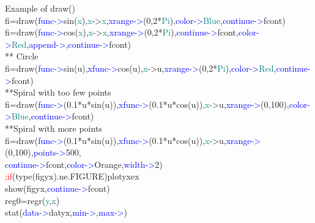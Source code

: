 \begin{example}[drawex]Example of \textcolor{VioletRed}{draw}()\\ 
\label{drawex} 
\noindent fi=\textcolor{VioletRed}{draw}(\textcolor{blue}{func->}\textcolor{VioletRed}{sin}(\textcolor{teal}{x}),\textcolor{teal}{x}->\textcolor{teal}{x},\textcolor{blue}{xrange->}(0,2*\textcolor{teal}{Pi}),\textcolor{blue}{color->}\textcolor{teal}{Blue},\textcolor{blue}{continue->}fcont)\\ 
fi=\textcolor{VioletRed}{draw}(\textcolor{blue}{func->}\textcolor{VioletRed}{cos}(\textcolor{teal}{x}),\textcolor{teal}{x}->\textcolor{teal}{x},\textcolor{blue}{xrange->}(0,2*\textcolor{teal}{Pi}),\textcolor{blue}{continue->}fcont,\textcolor{blue}{color->}\textcolor{teal}{Red},\textcolor{blue}{append->},\textcolor{blue}{continue->}fcont)\\ 
{\color{ForestGreen}** Circle}\\ 
fi=\textcolor{VioletRed}{draw}(\textcolor{blue}{func->}\textcolor{VioletRed}{sin}(u),\textcolor{blue}{xfunc->}\textcolor{VioletRed}{cos}(u),\textcolor{teal}{x}->u,\textcolor{blue}{xrange->}(0,2*\textcolor{teal}{Pi}),\textcolor{blue}{color->}\textcolor{teal}{Red},\textcolor{blue}{continue->}fcont)\\ 
{\color{ForestGreen}**Spiral with too few points}\\ 
fi=\textcolor{VioletRed}{draw}(\textcolor{blue}{func->}(0.1*u*\textcolor{VioletRed}{sin}(u)),\textcolor{blue}{xfunc->}(0.1*u*\textcolor{VioletRed}{cos}(u)),\textcolor{teal}{x}->u,\textcolor{blue}{xrange->}(0,100),\textcolor{blue}{color->}\textcolor{teal}{Blue},\textcolor{blue}{continue->}fcont)\\ 
{\color{ForestGreen}**Spiral with more points}\\ 
fi=\textcolor{VioletRed}{draw}(\textcolor{blue}{func->}(0.1*u*\textcolor{VioletRed}{sin}(u)),\textcolor{blue}{xfunc->}(0.1*u*\textcolor{VioletRed}{cos}(u)),\textcolor{teal}{x}->u,\textcolor{blue}{xrange->}(0,100),\textcolor{blue}{points->}500,\\ 
\textcolor{blue}{continue->}fcont,\textcolor{blue}{color->}Orange,\textcolor{blue}{width->}2)\\ 
\textcolor{Red}{;if}(\textcolor{VioletRed}{type}(figyx).ne.FIGURE)plotyxex\\ 
\textcolor{VioletRed}{show}(figyx,\textcolor{blue}{continue->}fcont)\\ 
reg0=\textcolor{VioletRed}{regr}(\textcolor{teal}{y},\textcolor{teal}{x})\\ 
\textcolor{VioletRed}{stat}(\textcolor{blue}{data->}datyx,\textcolor{blue}{min->},\textcolor{blue}{max->})\\ 

\end{example}
